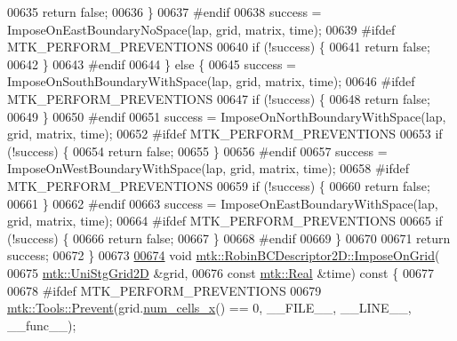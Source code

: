 \begin{DoxyCode}
00635       \textcolor{keywordflow}{return} \textcolor{keyword}{false};
00636     \}
00637 \textcolor{preprocessor}{    #endif}
00638     success = ImposeOnEastBoundaryNoSpace(lap, grid, matrix, time);
00639 \textcolor{preprocessor}{    #ifdef MTK\_PERFORM\_PREVENTIONS}
00640     \textcolor{keywordflow}{if} (!success) \{
00641       \textcolor{keywordflow}{return} \textcolor{keyword}{false};
00642     \}
00643 \textcolor{preprocessor}{    #endif}
00644   \} \textcolor{keywordflow}{else} \{
00645     success = ImposeOnSouthBoundaryWithSpace(lap, grid, matrix, time);
00646 \textcolor{preprocessor}{    #ifdef MTK\_PERFORM\_PREVENTIONS}
00647     \textcolor{keywordflow}{if} (!success) \{
00648       \textcolor{keywordflow}{return} \textcolor{keyword}{false};
00649     \}
00650 \textcolor{preprocessor}{    #endif}
00651     success = ImposeOnNorthBoundaryWithSpace(lap, grid, matrix, time);
00652 \textcolor{preprocessor}{    #ifdef MTK\_PERFORM\_PREVENTIONS}
00653     \textcolor{keywordflow}{if} (!success) \{
00654       \textcolor{keywordflow}{return} \textcolor{keyword}{false};
00655     \}
00656 \textcolor{preprocessor}{    #endif}
00657     success = ImposeOnWestBoundaryWithSpace(lap, grid, matrix, time);
00658 \textcolor{preprocessor}{    #ifdef MTK\_PERFORM\_PREVENTIONS}
00659     \textcolor{keywordflow}{if} (!success) \{
00660       \textcolor{keywordflow}{return} \textcolor{keyword}{false};
00661     \}
00662 \textcolor{preprocessor}{    #endif}
00663     success = ImposeOnEastBoundaryWithSpace(lap, grid, matrix, time);
00664 \textcolor{preprocessor}{    #ifdef MTK\_PERFORM\_PREVENTIONS}
00665     \textcolor{keywordflow}{if} (!success) \{
00666       \textcolor{keywordflow}{return} \textcolor{keyword}{false};
00667     \}
00668 \textcolor{preprocessor}{    #endif}
00669   \}
00670 
00671   \textcolor{keywordflow}{return} success;
00672 \}
00673 
\hypertarget{mtk__robin__bc__descriptor__2d_8cc_source_l00674}{}\hyperlink{classmtk_1_1RobinBCDescriptor2D_ac9564bc46c196cbf4720a0e4b93da8b0}{00674} \textcolor{keywordtype}{void} \hyperlink{classmtk_1_1RobinBCDescriptor2D_ac9564bc46c196cbf4720a0e4b93da8b0}{mtk::RobinBCDescriptor2D::ImposeOnGrid}(
00675     \hyperlink{classmtk_1_1UniStgGrid2D}{mtk::UniStgGrid2D} &grid,
00676     \textcolor{keyword}{const} \hyperlink{group__c01-roots_gac080bbbf5cbb5502c9f00405f894857d}{mtk::Real} &time)\textcolor{keyword}{ const }\{
00677 
00678 \textcolor{preprocessor}{  #ifdef MTK\_PERFORM\_PREVENTIONS}
00679   \hyperlink{classmtk_1_1Tools_a332324c6f25e66be9dff48c5987a3b9f}{mtk::Tools::Prevent}(grid.\hyperlink{classmtk_1_1UniStgGrid2D_a2d182866a398aba8e4829590e85bf939}{num\_cells\_x}() == 0, \_\_FILE\_\_, \_\_LINE\_\_, \_\_func\_\_);

\end{DoxyCode}
